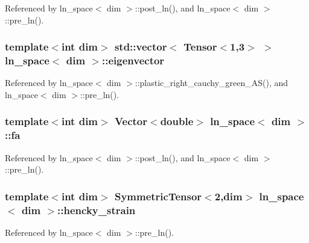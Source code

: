 Referenced by ln\+\_\+space$<$ dim $>$\+::post\+\_\+ln(), and ln\+\_\+space$<$ dim $>$\+::pre\+\_\+ln().

\subsubsection[{\texorpdfstring{eigenvector}{eigenvector}}]{\setlength{\rightskip}{0pt plus 5cm}template$<$int dim$>$ std\+::vector$<$ Tensor$<$1,3$>$ $>$ {\bf ln\+\_\+space}$<$ dim $>$\+::eigenvector\hspace{0.3cm}{\ttfamily [private]}}\hypertarget{classln__space_ada3f56f8a97f974275c267ac172a0b40}{}\label{classln__space_ada3f56f8a97f974275c267ac172a0b40}


Referenced by ln\+\_\+space$<$ dim $>$\+::plastic\+\_\+right\+\_\+cauchy\+\_\+green\+\_\+\+A\+S(), and ln\+\_\+space$<$ dim $>$\+::pre\+\_\+ln().

\subsubsection[{\texorpdfstring{fa}{fa}}]{\setlength{\rightskip}{0pt plus 5cm}template$<$int dim$>$ Vector$<$double$>$ {\bf ln\+\_\+space}$<$ dim $>$\+::fa\hspace{0.3cm}{\ttfamily [private]}}\hypertarget{classln__space_aff1eab9675707d7aeed154aadb11adf4}{}\label{classln__space_aff1eab9675707d7aeed154aadb11adf4}


Referenced by ln\+\_\+space$<$ dim $>$\+::post\+\_\+ln(), and ln\+\_\+space$<$ dim $>$\+::pre\+\_\+ln().

\subsubsection[{\texorpdfstring{hencky\+\_\+strain}{hencky_strain}}]{\setlength{\rightskip}{0pt plus 5cm}template$<$int dim$>$ Symmetric\+Tensor$<$2,dim$>$ {\bf ln\+\_\+space}$<$ dim $>$\+::hencky\+\_\+strain}\hypertarget{classln__space_a2ccf220d438b7a29a53706167b102b5d}{}\label{classln__space_a2ccf220d438b7a29a53706167b102b5d}


Referenced by ln\+\_\+space$<$ dim $>$\+::pre\+\_\+ln().

